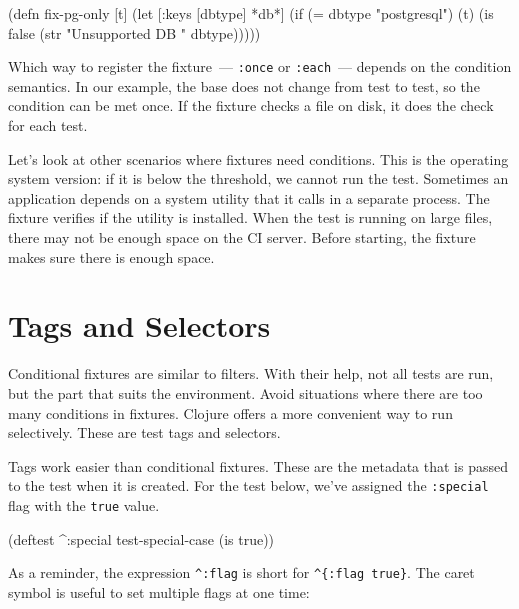 \else

\begin{english}
  \begin{clojure}
(defn fix-pg-only [t]
  (let [{:keys [dbtype]} *db*]
    (if (= dbtype "postgresql")
      (t)
      (is false (str "Unsupported DB " dbtype)))))
  \end{clojure}
\end{english}

\fi

Which way to register the fixture~--- \verb|:once| or \verb|:each|~--- depends on the condition semantics. In our example, the base does not change from test to test, so the condition can be met once. If the fixture checks a file on disk, it does the check for each test.

Let's look at other scenarios where fixtures need conditions. This is the operating system version: if it is below the threshold, we cannot run the test. Sometimes an application depends on a system utility that it calls in a separate process. The fixture verifies if the utility is installed. When the test is running on large files, there may not be enough space on the CI server. Before starting, the fixture makes sure there is enough space.

\section{Tags and Selectors}


Conditional fixtures are similar to filters. With their help, not all tests are run, but the part that suits the environment. Avoid situations where there are too many conditions in fixtures. Clojure offers a more convenient way to run selectively. These are test tags and selectors.

Tags work easier than conditional fixtures. These are the metadata that is passed to the test when it is created. For the test below, we've assigned the \verb|:special| flag with the \verb|true| value.

\begin{english}
  \begin{clojure}
(deftest ^:special test-special-case
  (is true))
  \end{clojure}
\end{english}


As a reminder, the expression \verb|^:flag| is short for \verb|^{:flag true}|. The caret symbol is useful to set multiple flags at one time:

